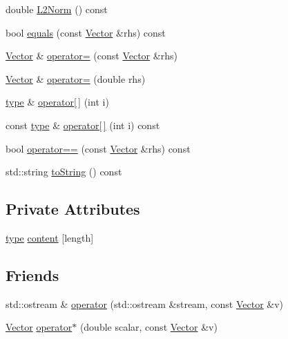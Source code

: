 \begin{DoxyCompactItemize}
\item 
double \hyperlink{classutils_1_1Vector_aa54009b6a76a8059de0eccbe43524d0c}{L2\-Norm} () const 
\item 
bool \hyperlink{classutils_1_1Vector_a761ff3d4c09a533535452b2a20038782}{equals} (const \hyperlink{classutils_1_1Vector}{Vector} \&rhs) const 
\item 
\hyperlink{classutils_1_1Vector}{Vector} \& \hyperlink{classutils_1_1Vector_a16812f2bf90d9e79b58fd42860c111e7}{operator=} (const \hyperlink{classutils_1_1Vector}{Vector} \&rhs)
\item 
\hyperlink{classutils_1_1Vector}{Vector} \& \hyperlink{classutils_1_1Vector_a5c1cfa1d42abdd9a90b4913892608386}{operator=} (double rhs)
\item 
\hyperlink{classtype}{type} \& \hyperlink{classutils_1_1Vector_a391fe7cbc2441879439fbc191ec4ef03}{operator\mbox{[}$\,$\mbox{]}} (int i)
\item 
const \hyperlink{classtype}{type} \& \hyperlink{classutils_1_1Vector_a3b965c400abae02fcad3751cf4b79309}{operator\mbox{[}$\,$\mbox{]}} (int i) const 
\item 
bool \hyperlink{classutils_1_1Vector_a04ceba4a8df8a367205d1c57063ec3f8}{operator==} (const \hyperlink{classutils_1_1Vector}{Vector} \&rhs) const 
\item 
std\-::string \hyperlink{classutils_1_1Vector_ab71fcfc3a0e80ee4a7d2c0fc76fed9a0}{to\-String} () const 
\end{DoxyCompactItemize}
\subsection*{Private Attributes}
\begin{DoxyCompactItemize}
\item 
\hyperlink{classtype}{type} \hyperlink{classutils_1_1Vector_ab391d67eb8f8563b4dd4b80390a4631a}{content} \mbox{[}length\mbox{]}
\end{DoxyCompactItemize}
\subsection*{Friends}
\begin{DoxyCompactItemize}
\item 
std\-::ostream \& \hyperlink{classutils_1_1Vector_a49b910c983e6c91855b55ab04d401e4f}{operator} (std\-::ostream \&stream, const \hyperlink{classutils_1_1Vector}{Vector} \&v)
\item 
\hyperlink{classutils_1_1Vector}{Vector} \hyperlink{classutils_1_1Vector_a45c43d96a8bbe774870183ff33079584}{operator$\ast$} (double scalar, const \hyperlink{classutils_1_1Vector}{Vector} \&v)
\end{DoxyCompactItemize}


